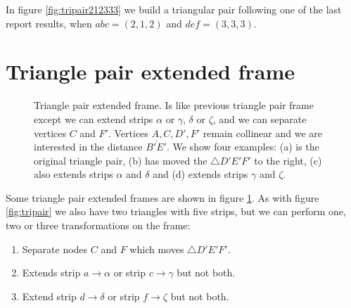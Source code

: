 \documentclass[11pt]{article}
\begin{document}
In figure \ref{fig:tripair212333} we build a triangular pair following one of the last report results, when $abc=(2,1,2)$ and $def=(3,3,3)$.


\section{Triangle pair extended frame}

\begin{figure}[H]
 \centering
 \caption{Triangle pair extended frame. Is like previous triangle pair frame except
 we can extend strips $\alpha$ or $\gamma$, $\delta$ or $\zeta$, and we can separate vertices $C$ and $F'$.
 Vertices $A,C,D',F'$ remain collinear and we are interested in the distance $\overline{B'E'}$.
 We show four examples: (a) is the original triangle pair,
 (b) has moved the $\triangle{D'E'F'}$ to the right,
 (c) also extends strips $\alpha$ and $\delta$ and (d) extends strips $\gamma$ and $\zeta$.
 }
 \label{fig:tripairext}
\end{figure}

Some triangle pair extended frames are shown in figure \ref{fig:tripairext}.
As with figure \ref{fig:tripair} we also have two triangles with five strips,
but we can perform one, two or three transformations on the frame: 
\begin{enumerate}
 \item Separate nodes $C$ and $F$ which moves $\triangle{D'E'F'}$.
 \item Extends strip $a \rightarrow \alpha$ or strip $c \rightarrow \gamma$ but not both.
 \item Extend strip $d \rightarrow \delta$ or strip $f \rightarrow \zeta$ but not both.
\end{enumerate}
\end{document}
